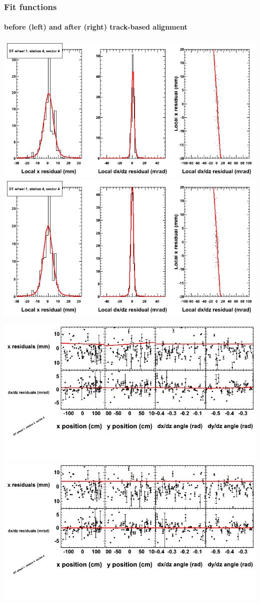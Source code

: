 \documentclass[compress]{beamer}
\begin{document}
\begin{frame}
\frametitle{Fit functions}
\framesubtitle{before (left) and after (right) track-based alignment}
\includegraphics[width=0.5\linewidth]{fitfunctions_re01/MBwhDst4sec04_bellcurves.png} \includegraphics[width=0.5\linewidth]{fitfunctions_re05/MBwhDst4sec04_bellcurves.png}

\includegraphics[width=0.5\linewidth]{fitfunctions_re01/MBwhDst4sec04_polynomials.png} \includegraphics[width=0.5\linewidth]{fitfunctions_re05/MBwhDst4sec04_polynomials.png}
\end{frame}
\end{document}

